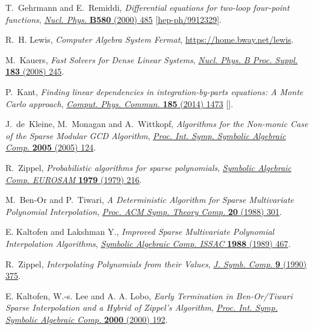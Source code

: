 \documentclass[11pt,a4paper,DIV=11,numbers=noenddot,parskip=half]{scrartcl}
\begin{document}
\begin{thebibliography}{10}
T.~Gehrmann and E.~Remiddi, \emph{{Differential equations for two-loop
  four-point functions}},
  \href{https://doi.org/10.1016/S0550-3213(00)00223-6}{\emph{Nucl. Phys.}
  {\bfseries B580} (2000) 485}
  [\href{https://arxiv.org/abs/hep-ph/9912329}{{\ttfamily hep-ph/9912329}}].

R.~H. Lewis, \emph{{Computer Algebra System Fermat}},
  \href{https://home.bway.net/lewis}{https://home.bway.net/lewis}.

M.~Kauers, \emph{{Fast Solvers for Dense Linear Systems}},
  \href{https://doi.org/10.1016/j.nuclphysbps.2008.09.111}{\emph{Nucl. Phys. B
  Proc. Suppl.} {\bfseries 183} (2008) 245}.

P.~Kant, \emph{{Finding linear dependencies in integration-by-parts equations:
  A Monte Carlo approach}},
  \href{https://doi.org/10.1016/j.cpc.2014.01.017}{\emph{Comput. Phys. Commun.}
  {\bfseries 185} (2014) 1473}
  [\href{https://arxiv.org/abs/1309.7287}{{}}].

J.~de~Kleine, M.~Monagan and A.~Wittkopf, \emph{{Algorithms for the Non-monic
  Case of the Sparse Modular GCD Algorithm}},
  \href{https://doi.org/10.1145/1073884.1073903}{\emph{Proc. Int. Symp.
  Symbolic Algebraic Comp.} {\bfseries 2005} (2005) 124}.

R.~Zippel, \emph{{Probabilistic algorithms for sparse polynomials}},
  \href{https://doi.org/10.1007/3-540-09519-5_73}{\emph{Symbolic Algebraic
  Comp. EUROSAM} {\bfseries 1979} (1979) 216}.

M.~Ben-Or and P.~Tiwari, \emph{{A Deterministic Algorithm for Sparse
  Multivariate Polynomial Interpolation}},
  \href{https://doi.org/10.1145/62212.62241}{\emph{Proc. ACM Symp. Theory
  Comp.} {\bfseries 20} (1988) 301}.

{E. Kaltofen and Lakshman Y.}, \emph{{Improved Sparse Multivariate Polynomial
  Interpolation Algorithms}},
  \href{https://doi.org/10.1007/3-540-51084-2_44}{\emph{Symbolic Algebraic
  Comp. ISSAC} {\bfseries 1988} (1989) 467}.

R.~Zippel, \emph{{Interpolating Polynomials from their Values}},
  \href{https://doi.org/10.1016/S0747-7171(08)80018-1}{\emph{J. Symb. Comp.}
  {\bfseries 9} (1990) 375}.

{E. Kaltofen, W.-s. Lee and A. A. Lobo}, \emph{{Early Termination in
  Ben-Or/Tiwari Sparse Interpolation and a Hybrid of Zippel's Algorithm}},
  \href{https://doi.org/10.1145/345542.345629}{\emph{Proc. Int. Symp. Symbolic
  Algebraic Comp.} {\bfseries 2000} (2000) 192}.


\end{thebibliography}
\end{document}
